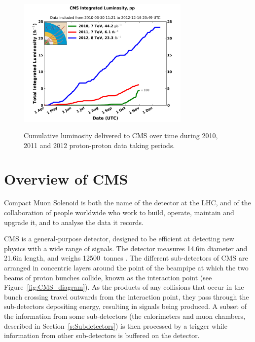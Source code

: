 \begin{figure}[hbtp]
   \centering
     \includegraphics[width=0.75\textwidth]{Chapters/02_Detector/Images/int_lumi_cumulative_pp_2.png}\\
     \caption[Cumulative luminosity delivered to CMS during 2010, 2011 and 2012.]{Cumulative luminosity
     delivered to CMS over time during 2010, 2011 and 2012 proton-proton data taking periods.}
     \label{fig:integrated_luminosity}
\end{figure}

\section{Overview of CMS}
\label{s:Overview}
Compact Muon Solenoid is both the name of the detector at the LHC, and of the collaboration of people
worldwide who work to build, operate, maintain and upgrade it, and to analyse the data it records.

CMS is a general-purpose detector, designed to be efficient at detecting new physics with a wide range of
signals. The detector measures 14.6\m in diameter and 21.6\m in length, and weighs 12500~tonnes
\cite{CMS_experiment}. The different sub-detectors of CMS are arranged in concentric layers around the point
of the beampipe at which the two beams of proton bunches collide, known as the interaction point (see
Figure~\ref{fig:CMS_diagram}). As the products of any collisions that occur in the bunch crossing travel
outwards from the interaction point, they pass through the sub-detectors depositing energy, resulting in
signals being produced. A subset of the information from some sub-detectors (the calorimeters and muon
chambers, described in Section~\ref{s:Subdetectors}) is then processed by a trigger while information from
other sub-detectors is buffered on the detector.

